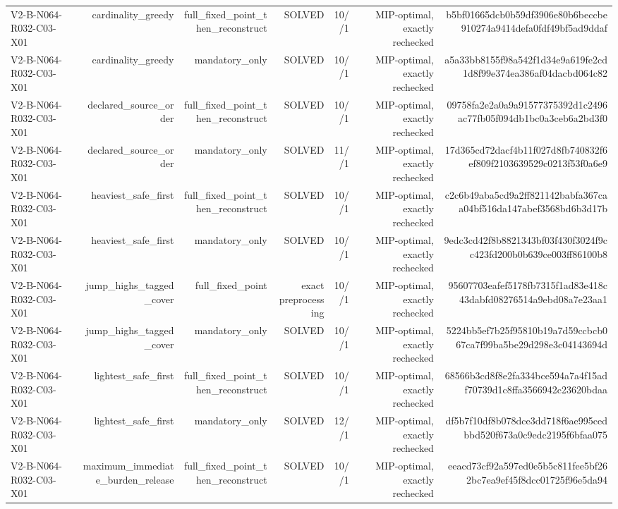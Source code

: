{\begin{longtable}{lrrrrrr}
V2-B-N064-R032-C03-X01 & cardinality\_greedy & full\_fixed\_point\_then\_reconstruct & SOLVED & 10//1 & MIP-optimal, exactly rechecked & b5bf01665dcb0b59df3906e80b6beccbe910274a9414defa0fdf49bf5ad9ddaf \\
V2-B-N064-R032-C03-X01 & cardinality\_greedy & mandatory\_only & SOLVED & 10//1 & MIP-optimal, exactly rechecked & a5a33bb8155f98a542f1d34e9a619fe2cd1d8f99e374ea386af04dacbd064c82 \\
V2-B-N064-R032-C03-X01 & declared\_source\_order & full\_fixed\_point\_then\_reconstruct & SOLVED & 10//1 & MIP-optimal, exactly rechecked & 09758fa2e2a0a9a91577375392d1c2496ac77fb05f094db1bc0a3ceb6a2bd3f0 \\
V2-B-N064-R032-C03-X01 & declared\_source\_order & mandatory\_only & SOLVED & 11//1 & MIP-optimal, exactly rechecked & 17d365cd72dacf4b11f027d8fb740832f6ef809f2103639529c0213f53f0a6e9 \\
V2-B-N064-R032-C03-X01 & heaviest\_safe\_first & full\_fixed\_point\_then\_reconstruct & SOLVED & 10//1 & MIP-optimal, exactly rechecked & c2c6b49aba5cd9a2ff821142babfa367caa04bf516da147abef3568bd6b3d17b \\
V2-B-N064-R032-C03-X01 & heaviest\_safe\_first & mandatory\_only & SOLVED & 10//1 & MIP-optimal, exactly rechecked & 9edc3cd42f8b8821343bf03f430f3024f9cc423fd200b0b639ce003ff86100b8 \\
V2-B-N064-R032-C03-X01 & jump\_highs\_tagged\_cover & full\_fixed\_point & exact preprocessing & 10//1 & MIP-optimal, exactly rechecked & 95607703eafef5178fb7315f1ad83e418c43dabfd08276514a9ebd08a7e23aa1 \\
V2-B-N064-R032-C03-X01 & jump\_highs\_tagged\_cover & mandatory\_only & SOLVED & 10//1 & MIP-optimal, exactly rechecked & 5224bb5ef7b25f95810b19a7d59ccbcb067ca7f99ba5be29d298e3c04143694d \\
V2-B-N064-R032-C03-X01 & lightest\_safe\_first & full\_fixed\_point\_then\_reconstruct & SOLVED & 10//1 & MIP-optimal, exactly rechecked & 68566b3cd8f8e2fa334bce594a7a4f15adf70739d1c8ffa3566942c23620bdaa \\
V2-B-N064-R032-C03-X01 & lightest\_safe\_first & mandatory\_only & SOLVED & 12//1 & MIP-optimal, exactly rechecked & df5b7f10df8b078dce3dd718f6ae995cedbbd520f673a0c9edc2195f6bfaa075 \\
V2-B-N064-R032-C03-X01 & maximum\_immediate\_burden\_release & full\_fixed\_point\_then\_reconstruct & SOLVED & 10//1 & MIP-optimal, exactly rechecked & eeacd73cf92a597ed0e5b5c811fee5bf262bc7ea9ef45f8dcc01725f96e5da94 \\

\end{longtable}}
